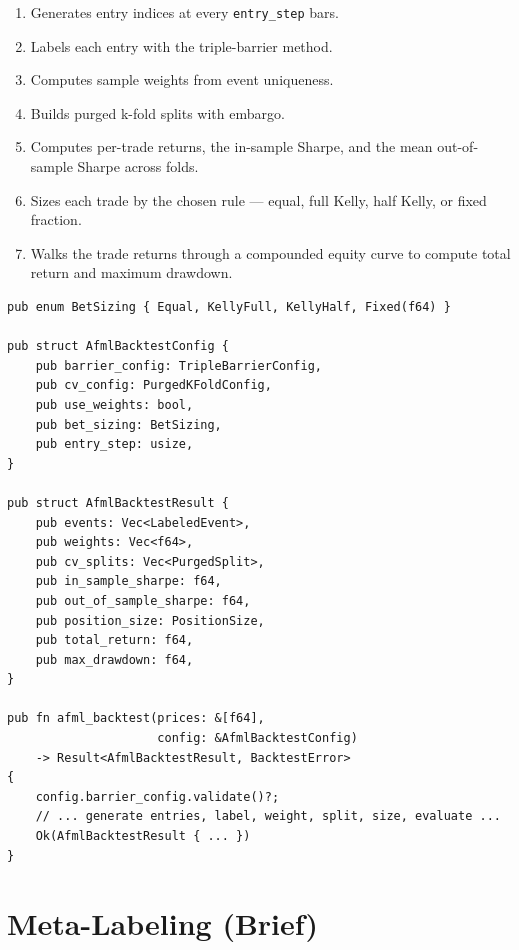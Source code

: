 \begin{enumerate}
    \item Generates entry indices at every \texttt{entry\_step} bars.
    \item Labels each entry with the triple-barrier method.
    \item Computes sample weights from event uniqueness.
    \item Builds purged k-fold splits with embargo.
    \item Computes per-trade returns, the in-sample Sharpe, and the
      mean out-of-sample Sharpe across folds.
    \item Sizes each trade by the chosen  rule ---
      equal, full Kelly, half Kelly, or fixed fraction.
    \item Walks the trade returns through a compounded equity curve
      to compute total return and maximum drawdown.
\end{enumerate}

\begin{lstlisting}[caption={End-to-end AFML backtest}]
pub enum BetSizing { Equal, KellyFull, KellyHalf, Fixed(f64) }

pub struct AfmlBacktestConfig {
    pub barrier_config: TripleBarrierConfig,
    pub cv_config: PurgedKFoldConfig,
    pub use_weights: bool,
    pub bet_sizing: BetSizing,
    pub entry_step: usize,
}

pub struct AfmlBacktestResult {
    pub events: Vec<LabeledEvent>,
    pub weights: Vec<f64>,
    pub cv_splits: Vec<PurgedSplit>,
    pub in_sample_sharpe: f64,
    pub out_of_sample_sharpe: f64,
    pub position_size: PositionSize,
    pub total_return: f64,
    pub max_drawdown: f64,
}

pub fn afml_backtest(prices: &[f64],
                     config: &AfmlBacktestConfig)
    -> Result<AfmlBacktestResult, BacktestError>
{
    config.barrier_config.validate()?;
    // ... generate entries, label, weight, split, size, evaluate ...
    Ok(AfmlBacktestResult { ... })
}
\end{lstlisting}


\section{Meta-Labeling (Brief)}

